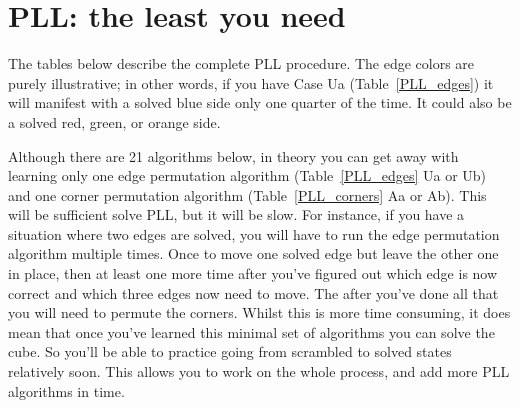 \documentclass[paper=a4, fontsize=11pt, parskip=full]{scrartcl} %
\newcommand{\2}{\ensuremath{^2}} %
\begin{document}
\begin{table}[ht]
\begin{tabular}{>{\centering}m{1.2in} >{}m{1.8in} >{\centering}m{1.2in} >{}m{1.8in}}
    \bottomrule

  \end{tabular}
  \label{OLL2}
\end{table}

\clearpage

\section{PLL: the least you need}
The tables below describe the complete PLL procedure. The edge colors are purely illustrative; 
in other words, if you have 
Case Ua (Table~\ref{PLL_edges}) it will manifest with a solved blue side only one quarter of the 
time. It could also be a solved red, green, or orange side. 

Although there are 21 algorithms below, in theory you can get away with learning only one edge 
permutation algorithm (Table~\ref{PLL_edges} Ua or Ub) and one corner permutation 
algorithm (Table~\ref{PLL_corners} Aa or Ab). This will be sufficient solve PLL, but it will be 
slow. For instance, if you have a situation where two edges are solved, you will have to run the 
edge permutation algorithm multiple times. Once to move one solved edge but leave the 
other one in place, then at least one more time after you've figured out which edge is now 
correct and which three edges now need to move. The after you've done all that you will need to 
permute the corners. Whilst this is more time consuming, it does mean that once you've learned 
this minimal set of algorithms you can solve the cube. So you'll be able to practice going 
from scrambled to solved states relatively soon. This allows you to work on the whole process, 
and add more PLL algorithms in time. 
\end{document}

